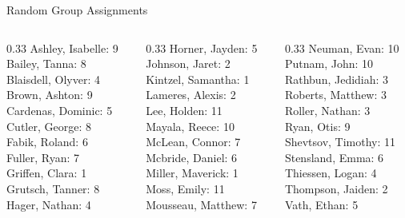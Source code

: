 \documentclass[10pt]{beamer}
\begin{document}
\begin{frame}{Random Group Assignments}
\begin{columns}
\begin{column}{0.33\textwidth}
Ashley, Isabelle: 9 \\ 
Bailey, Tanna: 8 \\ 
Blaisdell, Olyver: 4 \\ 
Brown, Ashton: 9 \\ 
Cardenas, Dominic: 5 \\ 
Cutler, George: 8 \\ 
Fabik, Roland: 6 \\ 
Fuller, Ryan: 7 \\ 
Griffen, Clara: 1 \\ 
Grutsch, Tanner: 8 \\ 
Hager, Nathan: 4 \\\end{column}
\begin{column}{0.33\textwidth}
Horner, Jayden: 5 \\ 
Johnson, Jaret: 2 \\ 
Kintzel, Samantha: 1 \\ 
Lameres, Alexis: 2 \\ 
Lee, Holden: 11 \\ 
Mayala, Reece: 10 \\ 
McLean, Connor: 7 \\ 
Mcbride, Daniel: 6 \\ 
Miller, Maverick: 1 \\ 
Moss, Emily: 11 \\ 
Mousseau, Matthew: 7 \\\end{column}
\begin{column}{0.33\textwidth}
Neuman, Evan: 10 \\ 
Putnam, John: 10 \\ 
Rathbun, Jedidiah: 3 \\ 
Roberts, Matthew: 3 \\ 
Roller, Nathan: 3 \\ 
Ryan, Otis: 9 \\ 
Shevtsov, Timothy: 11 \\ 
Stensland, Emma: 6 \\ 
Thiessen, Logan: 4 \\ 
Thompson, Jaiden: 2 \\ 
Vath, Ethan: 5 \\\end{column}
\end{columns}	
\end{frame}
\end{document}

